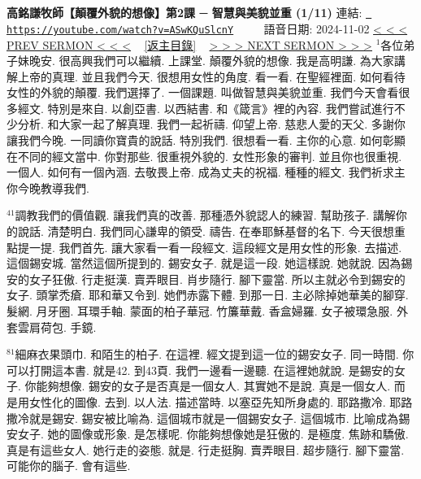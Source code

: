 \documentclass{book}
\begin{document}
\section{}
\label{sec:ASwKQuSlcnY}
\textbf{高銘謙牧師【顛覆外貌的想像】第2課 ─ 智慧與美貌並重 (1/11)}
\newline
\newline
連結: \href{https://youtube.com/watch?v=ASwKQuSlcnY}{\texttt{ https://youtube.com/watch?v=ASwKQuSlcnY}} ~~~~ 語音日期: 2024-11-02 
\newline
\newline
\hyperref[sec:Hhm2a_HII7A]{\small{< < < PREV SERMON < < <}}
~
\hyperref[sec:index]{\small{[返主目錄]}}
~
\hyperref[sec:Fy3Amm4Hv4o]{\small{> > > NEXT SERMON > > >}}
\newline
\newline
$^{1}$各位弟子妹晚安.
很高興我們可以繼續.
上課堂.
顛覆外貌的想像.
我是高明謙.
為大家講解上帝的真理.
並且我們今天.
很想用女性的角度.
看一看.
在聖經裡面.
如何看待女性的外貌的顛覆.
我們選擇了.
一個課題.
叫做智慧與美貌並重.
我們今天會看很多經文.
特別是來自.
以創亞書.
以西結書.
和《箴言》裡的內容.
我們嘗試進行不少分析.
和大家一起了解真理.
我們一起祈禱.
仰望上帝.
慈悲人愛的天父.
多謝你讓我們今晚.
一同讀你寶貴的說話.
特別我們.
很想看一看.
主你的心意.
如何彰顯在不同的經文當中.
你對那些.
很重視外貌的.
女性形象的審判.
並且你也很重視.
一個人.
如何有一個內涵.
去敬畏上帝.
成為丈夫的祝福.
種種的經文.
我們祈求主你今晚教導我們.

$^{41}$調教我們的價值觀.
讓我們真的改善.
那種憑外貌認人的練習.
幫助孩子.
講解你的說話.
清楚明白.
我們同心謙卑的領受.
禱告.
在奉耶穌基督的名下.
今天很想重點提一提.
我們首先.
讓大家看一看一段經文.
這段經文是用女性的形象.
去描述.
這個錫安城.
當然這個所提到的.
錫安女子.
就是這一段.
她這樣說.
她就說.
因為錫安的女子狂傲.
行走挺漢.
賣弄眼目.
肖步隨行.
腳下靈當.
所以主就必令到錫安的女子.
頭掌禿瘡.
耶和華又令到.
她們赤露下體.
到那一日.
主必除掉她華美的腳穿.
髮網.
月牙圈.
耳環手軸.
蒙面的柏子華冠.
竹簾華戴.
香盒婦羅.
女子被環急服.
外套雲肩荷包.
手鏡.

$^{81}$細麻衣果頭巾.
和陌生的柏子.
在這裡.
經文提到這一位的錫安女子.
同一時間.
你可以打開這本書.
就是42.
到43頁.
我們一邊看一邊聽.
在這裡她就說.
是錫安的女子.
你能夠想像.
錫安的女子是否真是一個女人.
其實她不是說.
真是一個女人.
而是用女性化的圖像.
去到.
以人法.
描述當時.
以塞亞先知所身處的.
耶路撒冷.
耶路撒冷就是錫安.
錫安被比喻為.
這個城市就是一個錫安女子.
這個城市.
比喻成為錫安女子.
她的圖像或形象.
是怎樣呢.
你能夠想像她是狂傲的.
是極度.
焦跡和驕傲.
真是有這些女人.
她行走的姿態.
就是.
行走挺胸.
賣弄眼目.
超步隨行.
腳下靈當.
可能你的腦子.
會有這些.
\end{document}

